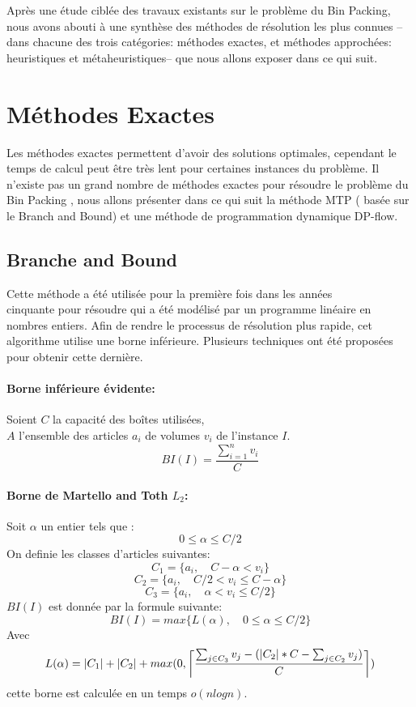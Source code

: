 \documentclass[class=report, crop=false]{standalone}
\DeclarePairedDelimiter\ceil{\lceil}{\rceil}
\begin{document}
\setcounter{section}{0}
    Après une étude ciblée des travaux existants sur le problème du Bin Packing, nous avons abouti à une synthèse des méthodes de résolution les plus connues --dans chacune des trois catégories: méthodes exactes, et méthodes approchées: heuristiques et métaheuristiques-- que nous allons exposer dans ce qui suit. 
    \section{Méthodes Exactes}
    Les méthodes exactes permettent d’avoir des solutions optimales, cependant le temps de calcul peut être très lent pour certaines instances du problème. Il n’existe pas un grand nombre de méthodes exactes pour résoudre le problème du Bin Packing , nous allons présenter dans ce qui suit la méthode  MTP ( basée sur le Branch and Bound) et une méthode de programmation dynamique DP-flow.
    \subsection{Branche and Bound}
    Cette méthode a été utilisée pour la première fois dans les années \\ cinquante pour résoudre qui a été  modélisé par un programme linéaire en nombres entiers.
Afin de rendre le processus de résolution plus rapide, cet algorithme utilise une borne inférieure. Plusieurs techniques ont été proposées pour obtenir cette dernière.
    \paragraph{Borne inférieure évidente:} Soient \(C\) la capacité des boîtes utilisées,\\
     \(A\) l’ensemble des articles \(a_i\) de volumes \(v_i\) de l’instance \(I\).
        \[BI(I)=\frac{\displaystyle\sum_{i=1}^{n} v_i}{C}\]
    \paragraph{Borne de Martello and Toth \(L_2\):}  
    Soit \(\alpha\) un entier tels que :
    \[0 \le \alpha \le C/2\]
    On definie les classes d'articles suivantes: 
    \[C_1 = \{a_i, \quad C-\alpha < v_i\} \]
    \[C_2 = \{a_i, \quad C/2 < v_i \le C-\alpha\} \]
    \[C_3 = \{a_i, \quad \alpha < v_i \le C/2\} \]
    \(BI(I)\)  est donnée par la formule suivante:
    \[BI(I)=max\{L(\alpha),\quad 0 \le \alpha \le C/2\}\]
    Avec
    \[L(\alpha)=|C_1|+|C_2|+max(0, \ceil*{\frac{\sum_{j \in C_3}^{} v_j - (|C_2|*C - \sum_{j \in C_2}^{} v_j) }{C}})\]
    cette borne est calculée en un temps \(o(nlogn)\).
\end{document}
